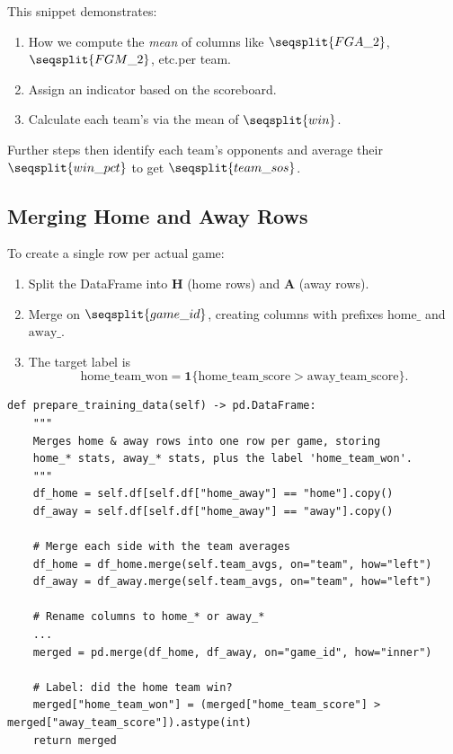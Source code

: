 \documentclass[12pt]{article}
\begin{document}
\noindent
This snippet demonstrates:
\begin{enumerate}[label=\roman*)]
    \item How we compute the \emph{mean} of columns like \(\seqsplit{FGA\_2}\), \(\seqsplit{FGM\_2}\), etc.\@ per team.
    \item Assign an indicator  based on the scoreboard.
    \item Calculate each team's  via the mean of \(\seqsplit{win}\).
\end{enumerate}
Further steps then identify each team's opponents and average their \(\seqsplit{win\_pct}\) to get \(\seqsplit{team\_sos}\).

\subsection{Merging Home and Away Rows}
To create a single row per actual game:
\begin{enumerate}[label=\arabic*)]
    \item Split the DataFrame into \(\mathbf{H}\) (home rows) and \(\mathbf{A}\) (away rows).
    \item Merge on \(\seqsplit{game\_id}\), creating columns with prefixes \(\text{home\_}\) and \(\text{away\_}\).
    \item The target label is 
    \[
    \text{home\_team\_won} = \mathbf{1}\{\text{home\_team\_score} > \text{away\_team\_score}\}.
    \]
\end{enumerate}

\begin{verbatim}
def prepare_training_data(self) -> pd.DataFrame:
    """
    Merges home & away rows into one row per game, storing
    home_* stats, away_* stats, plus the label 'home_team_won'.
    """
    df_home = self.df[self.df["home_away"] == "home"].copy()
    df_away = self.df[self.df["home_away"] == "away"].copy()

    # Merge each side with the team averages
    df_home = df_home.merge(self.team_avgs, on="team", how="left")
    df_away = df_away.merge(self.team_avgs, on="team", how="left")

    # Rename columns to home_* or away_*
    ...
    merged = pd.merge(df_home, df_away, on="game_id", how="inner")

    # Label: did the home team win?
    merged["home_team_won"] = (merged["home_team_score"] > merged["away_team_score"]).astype(int)
    return merged
\end{verbatim}
\end{document}
